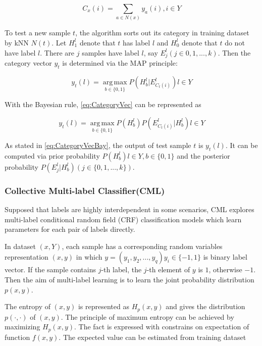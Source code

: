\begin{equation}\label{eq:KNNCounting}
C_{x}(i) = \sum_{a \in N(x)} y_{a}(i), i \in Y
\end{equation}

To test a new sample $t$, the algorithm sorts out its category in training dataset by kNN $N(t)$. Let $H_{1}^l$ denote that $t$ has label $l$ and $H_{0}^l$ denote that $t$ do not have label $l$. There are $j$ samples have label $l$, say $E_{j}^l (j \in {0,1,...,k})$. Then the category vector $y_{t}$ is determined via the MAP principle:

\begin{equation}\label{eq:CategoryVec}
y_{t}(l) = \operatorname*{arg\,max}_{b \in \{0,1\}} P(H_{b}^l|E_{C_{t}(i) }^l) l \in Y
\end{equation}

With the Bayesian rule, \ref{eq:CategoryVec} can be represented as

\begin{equation}\label{eq:CategoryVecBay}
y_{t}(l) = \operatorname*{arg\,max}_{b \in \{0,1\}} P(H_{b}^l)P(E_{C_{t}(i) }^l|H_{b}^l) l \in Y
\end{equation}

As stated in \ref{eq:CategoryVecBay}, the output of test sample $t$ is $y_{t}(l)$. It can be computed via prior probability $P(H_{b}^l) l \in Y, b \in \{0,1\}$ and the posterior probability $P(E_{j}^l|H_{b}^l) (j \in \{0,1,...,k\})$.

\subsubsection{Collective Multi-label Classifier(CML)}

Supposed that labels are highly interdependent in some scenarios, CML explores multi-label conditional random field (CRF) classification models which learn  parameters for each pair of labels directly\citep{ghamrawi2005collective}.

In dataset $(x,Y)$, each sample has a corresponding random variables representation $(x,y)$ in which $y = (y_{1},y_{2},...,y_{q}) y_{i} \in \{-1,1\}$ is binary label vector. If the sample contains $j$-th label, the $j$-th element of $y$ is $1$, otherwise $-1$. Then the aim of multi-label learning is to learn the joint probability distribution $p(x,y)$.

The entropy of $(x,y)$ is represented as $H_{p}(x,y)$ and gives the distribution $p(\cdot,\cdot)$ of $(x,y)$. The principle of maximum entropy can be achieved by maximizing $H_{p}(x,y)$. The fact is expressed with constrains on expectation of function $f(x,y)$. The expected value can be estimated from training dataset

